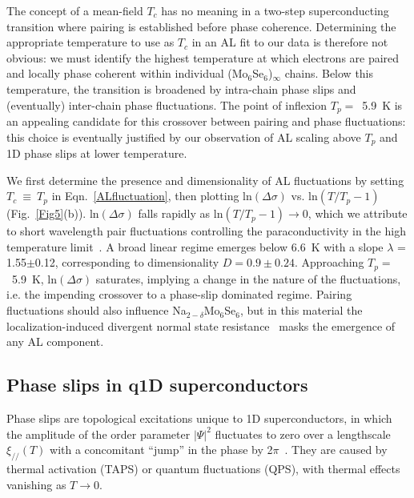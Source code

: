 \documentclass[prb,twocolumn,showpacs,preprintnumbers,amsmath,amssymb,floatfix,groupedaddress,superscriptaddress,aps,10pt]{revtex4-1}
\newcommand{\Na}{Na$_{2-\delta}$Mo$_6$Se$_6$}
\begin{document}
{{The concept of a mean-field $T_c$ has no meaning in a two-step superconducting transition where pairing is established before phase coherence.  Determining the appropriate temperature to use as $T_c$ in an AL fit to our data is therefore not obvious: we must identify the highest temperature at which electrons are paired and locally phase coherent within individual (Mo$_6$Se$_6$)$_\infty$ chains.  Below this temperature, the transition is broadened by intra-chain phase slips and (eventually) inter-chain phase fluctuations.  The point of inflexion $T_p=$~5.9~K is an appealing candidate for this crossover between pairing and phase fluctuations: this choice is eventually justified by our observation of AL scaling above $T_p$ and 1D phase slips at lower temperature. 

We first determine the presence and dimensionality of AL fluctuations by setting $T_c~\equiv~T_p$ in Eqn.~\ref{ALfluctuation}, then plotting $\mathrm{ln}(\Delta\sigma)$ vs. $\mathrm{ln}(T/T_p-1)$ (Fig.~\ref{Fig5}(b)).  $\mathrm{ln}(\Delta\sigma)$ falls rapidly as $\mathrm{ln}(T/T_p-1)\rightarrow0$, which we attribute to short wavelength pair fluctuations controlling the paraconductivity in the high temperature limit~\cite{Reggiani1991}.  A broad linear regime emerges below 6.6~K with a slope $\lambda$ = 1.55$\pm$0.12, corresponding to dimensionality $D=0.9\pm0.24$.  Approaching $T_p=$~5.9~K, $\mathrm{ln}(\Delta\sigma)$ saturates, implying a change in the nature of the fluctuations, i.e. the impending crossover to a phase-slip dominated regime.  Pairing fluctuations should also influence {\Na}, but in this material the localization-induced divergent normal state resistance~\cite{Ansermet2016} masks the emergence of any AL component.

\subsection{Phase slips in q1D superconductors}
Phase slips are topological excitations unique to 1D superconductors, in which the amplitude of the order parameter $\left|\Psi\right|^2$ fluctuates to zero over a lengthscale $\xi_{/\!/}(T)$ with a concomitant ``jump'' in the phase by 2$\pi$~\cite{Bezryadin,Altomare,Arutyunov2008}. They are caused by thermal activation (TAPS) or quantum fluctuations (QPS), with thermal effects vanishing as $T\rightarrow0$. 

}}
\end{document}
